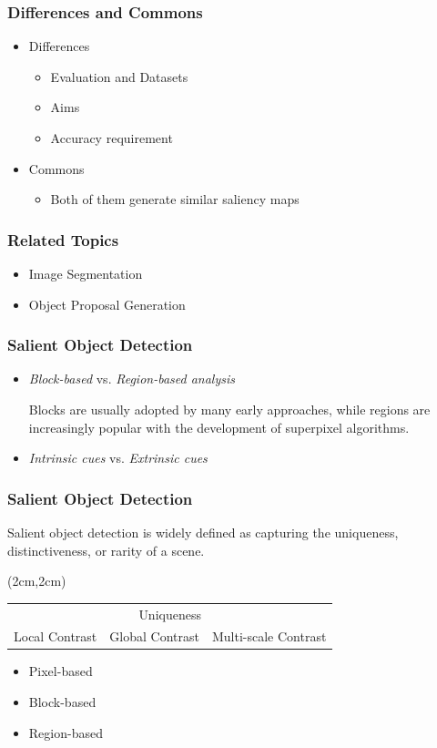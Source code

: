 \documentclass[notheorems,serif,table,compress]{beamer}  %
\begin{document}
\begin{frame}
\frametitle{Differences and Commons}
\begin{itemize}
\item Differences
\begin{itemize}
\item Evaluation and Datasets
\item Aims
\item Accuracy requirement 
\end{itemize}
\item Commons
\begin{itemize}
\item Both of them generate similar saliency maps
\end{itemize}
\end{itemize}
\end{frame}



\begin{frame}
\frametitle{Related Topics}
\begin{itemize}
\item Image Segmentation
\item Object Proposal Generation
\end{itemize}
\end{frame}


\begin{frame}
\frametitle{Salient Object Detection}
\begin{itemize}
\item {\color{blue}\emph{Block-based}} vs. {\color{blue}\emph{Region-based analysis}}

Blocks are usually adopted by many early approaches, while regions are increasingly popular with the development of superpixel algorithms.

\item {\color{blue}\emph{Intrinsic cues}} vs. {\color{blue}\emph{Extrinsic cues}}
\end{itemize}
\end{frame}


\begin{frame}
\frametitle{Salient Object Detection}
Salient object detection is widely defined as capturing the uniqueness, distinctiveness, or rarity of a scene.

\begin{textblock*}{10cm}(2cm,2cm)
\begin{tabular}{ccc}
\multicolumn{3}{c}{Uniqueness}\\
Local Contrast & Global Contrast & Multi-scale Contrast 
\end{tabular}
\end{textblock*}

\begin{itemize}
\item Pixel-based
\item Block-based 
\item Region-based
\end{itemize}
\end{frame}
\end{document}

